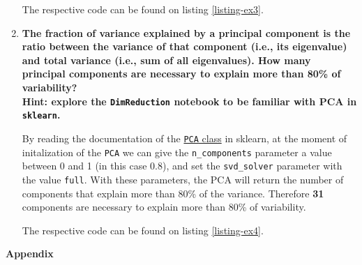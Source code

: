 \documentclass[12pt]{article}
\begin{document}
\begin{enumerate}[leftmargin=\labelsep]
          The respective code can be found on listing \ref{listing-ex3}.

    \item {\color{questioncolor}\bfseries
          The fraction of variance explained by a principal component is the ratio
          between the variance of that component (i.e., its eigenvalue) and total
          variance (i.e., sum of all eigenvalues).
          How many principal components are necessary to explain more than 80\%
          of variability?\\
          Hint: explore the \texttt{DimReduction} notebook to be familiar
          with PCA in \texttt{sklearn}.
          }\\
          \vspace{0.5em}

          By reading the documentation of the
          \href{https://scikit-learn.org/stable/modules/generated/sklearn.decomposition.PCA.html}{\texttt{PCA} class}
          in sklearn, at the moment of initalization of the \texttt{PCA} we can give
          the \texttt{n\_components} parameter a value between 0 and 1 (in this case 0.8),
          and set the \texttt{svd\_solver} parameter with the value \texttt{full}.
          With these parameters, the PCA will return the number of components that explain more than 80\% of the variance.
          Therefore \textbf{31} components are necessary to explain more than 80\% of variability.

          The respective code can be found on listing \ref{listing-ex4}.

\end{enumerate}

\pagebreak

\center\large{\textbf{Appendix}\vskip 0.3cm}



\vspace*{1.5cm}



\vspace*{1.5cm}


\end{document}
